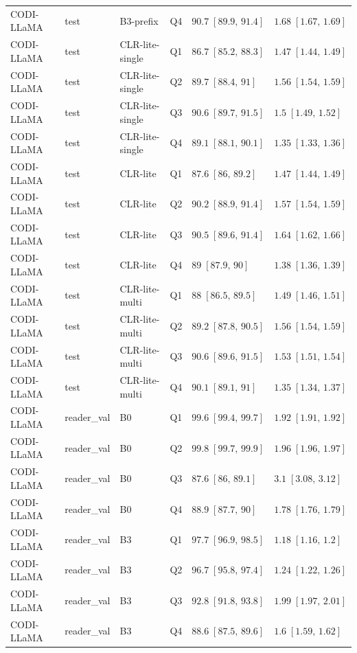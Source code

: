 \begin{longtable}{@{}p{}p{}p{}p{}p{}p{}@{}}
CODI-LLaMA & test & B3-prefix & Q4 & $90.7\;[89.9,\,91.4]$ & $1.68\;[1.67,\,1.69]$ \\
CODI-LLaMA & test & CLR-lite-single & Q1 & $86.7\;[85.2,\,88.3]$ & $1.47\;[1.44,\,1.49]$ \\
CODI-LLaMA & test & CLR-lite-single & Q2 & $89.7\;[88.4,\,91]$ & $1.56\;[1.54,\,1.59]$ \\
CODI-LLaMA & test & CLR-lite-single & Q3 & $90.6\;[89.7,\,91.5]$ & $1.5\;[1.49,\,1.52]$ \\
CODI-LLaMA & test & CLR-lite-single & Q4 & $89.1\;[88.1,\,90.1]$ & $1.35\;[1.33,\,1.36]$ \\
CODI-LLaMA & test & CLR-lite & Q1 & $87.6\;[86,\,89.2]$ & $1.47\;[1.44,\,1.49]$ \\
CODI-LLaMA & test & CLR-lite & Q2 & $90.2\;[88.9,\,91.4]$ & $1.57\;[1.54,\,1.59]$ \\
CODI-LLaMA & test & CLR-lite & Q3 & $90.5\;[89.6,\,91.4]$ & $1.64\;[1.62,\,1.66]$ \\
CODI-LLaMA & test & CLR-lite & Q4 & $89\;[87.9,\,90]$ & $1.38\;[1.36,\,1.39]$ \\
CODI-LLaMA & test & CLR-lite-multi & Q1 & $88\;[86.5,\,89.5]$ & $1.49\;[1.46,\,1.51]$ \\
CODI-LLaMA & test & CLR-lite-multi & Q2 & $89.2\;[87.8,\,90.5]$ & $1.56\;[1.54,\,1.59]$ \\
CODI-LLaMA & test & CLR-lite-multi & Q3 & $90.6\;[89.6,\,91.5]$ & $1.53\;[1.51,\,1.54]$ \\
CODI-LLaMA & test & CLR-lite-multi & Q4 & $90.1\;[89.1,\,91]$ & $1.35\;[1.34,\,1.37]$ \\
CODI-LLaMA & reader\_val & B0 & Q1 & $99.6\;[99.4,\,99.7]$ & $1.92\;[1.91,\,1.92]$ \\
CODI-LLaMA & reader\_val & B0 & Q2 & $99.8\;[99.7,\,99.9]$ & $1.96\;[1.96,\,1.97]$ \\
CODI-LLaMA & reader\_val & B0 & Q3 & $87.6\;[86,\,89.1]$ & $3.1\;[3.08,\,3.12]$ \\
CODI-LLaMA & reader\_val & B0 & Q4 & $88.9\;[87.7,\,90]$ & $1.78\;[1.76,\,1.79]$ \\
CODI-LLaMA & reader\_val & B3 & Q1 & $97.7\;[96.9,\,98.5]$ & $1.18\;[1.16,\,1.2]$ \\
CODI-LLaMA & reader\_val & B3 & Q2 & $96.7\;[95.8,\,97.4]$ & $1.24\;[1.22,\,1.26]$ \\
CODI-LLaMA & reader\_val & B3 & Q3 & $92.8\;[91.8,\,93.8]$ & $1.99\;[1.97,\,2.01]$ \\
CODI-LLaMA & reader\_val & B3 & Q4 & $88.6\;[87.5,\,89.6]$ & $1.6\;[1.59,\,1.62]$ \\

\end{longtable}
